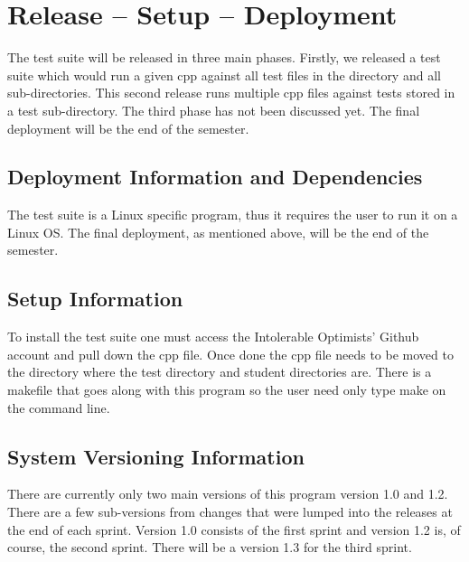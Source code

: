 
\chapter{Release -- Setup -- Deployment}
The test suite will be released in three main phases. Firstly, we released a test suite which would run a given cpp against all test files in the directory and all sub-directories. This second release runs multiple cpp files against tests stored in a test sub-directory. The third phase has not been discussed yet. The final deployment will be the end of the semester.


\section{Deployment Information and Dependencies}
The test suite is a Linux specific program, thus it requires the user to run it on a Linux OS. The final deployment, as mentioned above, will be the end of the semester.  



\section{Setup Information}
To install the test suite one must access the Intolerable Optimists' Github account and pull down the cpp file. Once done the cpp file needs to be moved to the directory where the test directory and student directories are. There is a makefile that goes along with this program so the user need only type make on the command line.



\section{System  Versioning Information}
There are currently only two main versions of this program version 1.0 and 1.2. There are a few sub-versions from changes that were lumped into the releases at the end of each sprint. 
Version 1.0 consists of the first sprint and version 1.2 is, of course, the second sprint. There will be a version 1.3 for the third sprint.
